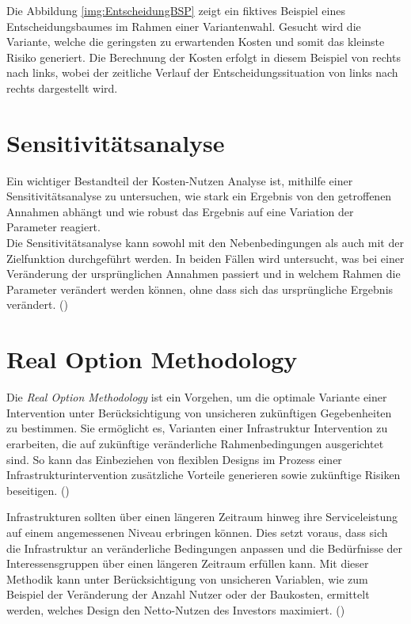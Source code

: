 Die Abbildung \ref{img:EntscheidungBSP} zeigt ein fiktives Beispiel eines Entscheidungsbaumes im Rahmen einer Variantenwahl. Gesucht wird die Variante, welche die geringsten zu erwartenden Kosten und somit das kleinste Risiko generiert. Die Berechnung der Kosten erfolgt in diesem Beispiel von rechts nach links, wobei der zeitliche Verlauf der Entscheidungssituation von links nach rechts dargestellt wird. 

\section{Sensitivitätsanalyse}
\label{sec:Sensitivität}

Ein wichtiger Bestandteil der Kosten-Nutzen Analyse ist, mithilfe einer Sensitivitätsanalyse zu untersuchen, wie stark ein Ergebnis von den getroffenen Annahmen abhängt und wie robust das Ergebnis auf eine Variation der Parameter reagiert. \\
Die Sensitivitätsanalyse kann sowohl mit den Nebenbedingungen als auch mit der Zielfunktion durchgeführt werden. In beiden Fällen wird untersucht, was bei einer Veränderung der ursprünglichen Annahmen passiert und in welchem Rahmen die Parameter verändert werden können, ohne dass sich das ursprüngliche Ergebnis verändert.  (\cite{Adey2019})

\pagebreak
 
\section{Real Option Methodology}
\label{sec:RealOption}

Die \textit{Real Option Methodology} ist ein Vorgehen, um die optimale Variante einer Intervention unter Berücksichtigung von unsicheren zukünftigen Gegebenheiten zu bestimmen. Sie ermöglicht es, Varianten einer Infrastruktur Intervention zu erarbeiten, die auf zukünftige veränderliche Rahmenbedingungen ausgerichtet sind. So kann das Einbeziehen von flexiblen Designs im Prozess einer Infrastrukturintervention zusätzliche Vorteile generieren sowie zukünftige Risiken beseitigen. (\cite{Neufville2011})

Infrastrukturen sollten über einen längeren Zeitraum hinweg ihre Serviceleistung auf einem angemessenen Niveau erbringen können. Dies setzt voraus, dass sich die Infrastruktur an veränderliche Bedingungen anpassen und die Bedürfnisse der Interessensgruppen über einen längeren Zeitraum erfüllen kann. 
Mit dieser Methodik kann unter Berücksichtigung von unsicheren Variablen, wie zum Beispiel der Veränderung der Anzahl Nutzer oder der Baukosten, ermittelt werden, welches Design den Netto-Nutzen des Investors maximiert. (\cite{Esders2015})




%

